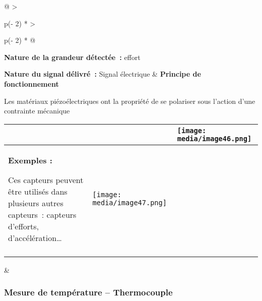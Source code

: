\documentclass[
]{article}
\begin{document}
\begin{longtable}[]{@{}
  >{\raggedright\arraybackslash}p{(\columnwidth - 2\tabcolsep) * }
  >{\raggedright\arraybackslash}p{(\columnwidth - 2\tabcolsep) * }@{}}
\toprule
\textbf{Nature de la grandeur détectée~:} effort

\textbf{Nature du signal délivré~:} Signal électrique & \textbf{Principe
de fonctionnement}

Les matériaux piézoélectriques ont la propriété de se polariser sous
l'action d'une contrainte mécanique \\
\midrule
\endhead
\begin{minipage}[t]{\linewidth}\raggedright
\begin{longtable}[]{@{}
  >{\raggedright\arraybackslash}p{}
  >{\raggedright\arraybackslash}p{}
  >{\raggedright\arraybackslash}p{}@{}}
\toprule
& &
\texttt{[image: media/image46.png]} \\
\midrule
\endhead
\textbf{Exemples :}

Ces capteurs peuvent être utilisés dans plusieurs autres capteurs~:
capteurs d'efforts, d'accélération\ldots{} &
\texttt{[image: media/image47.png]}
& \\
& & \\
\bottomrule
\end{longtable}
\end{minipage} & \\
\bottomrule
\end{longtable}

\hypertarget{mesure-de-tempuxe9rature-thermocouple}{%
\subsubsection{Mesure de température --
Thermocouple}\label{mesure-de-tempuxe9rature-thermocouple}}
\end{document}
